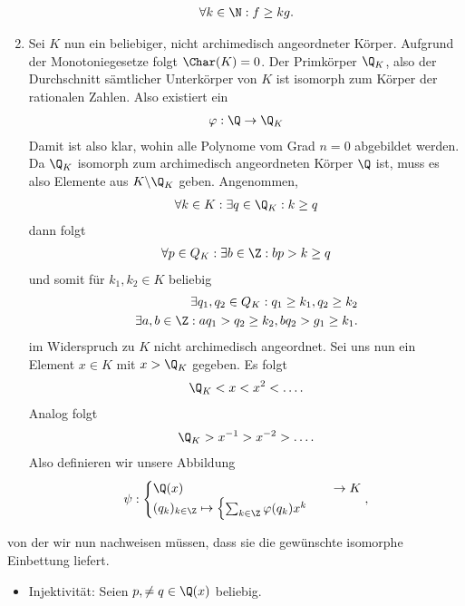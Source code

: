 \begin{solution}
\begin{enumerate}
\begin{align*}
    \forall k \in \N: f \geq kg.
  \end{align*}
  \item Sei $K$ nun ein beliebiger, nicht archimedisch angeordneter Körper.
  Aufgrund der Monotoniegesetze folgt $\Char(K) = 0$.
  Der Primkörper $\Q_K$, also der Durchschnitt sämtlicher Unterkörper von $K$
  ist isomorph zum Körper der rationalen Zahlen. Also existiert ein
  \begin{align*}
    \varphi: \Q \to \Q_K
  \end{align*}
  Damit ist also klar, wohin
  alle Polynome vom Grad $n = 0$ abgebildet werden.
  Da $\Q_K$ isomorph zum archimedisch angeordneten Körper $\Q$ ist,
  muss es also Elemente aus $K \backslash \Q_K$ geben.
  Angenommen,
  \begin{align*}
    \forall k \in K: \exists q \in \Q_K: k \geq q
  \end{align*}
  dann folgt
  \begin{align*}
    \forall p \in Q_K: \exists b \in \Z: bp > k \geq q
  \end{align*}
  und somit für $k_1, k_2 \in K$ beliebig
  \begin{align*}
    \exists q_1,q_2 \in Q_K: q_1 \geq k_1, q_2 \geq k_2 \\
    \exists a,b \in \Z: aq_1 > q_2 \geq k_2, bq_2 > g_1 \geq k_1.
  \end{align*}
  im Widerspruch zu $K$ nicht archimedisch angeordnet.
  Sei uns nun ein Element $x \in K$ mit $x > \Q_K$ gegeben. Es folgt
  \begin{align*}
    \Q_K < x < x^2 < \dots.
  \end{align*}
  Analog folgt
  \begin{align*}
    \Q_K > x^{-1} > x^{-2} > \dots.
  \end{align*}
  Also definieren wir unsere Abbildung
  \begin{align*}
    \psi: \begin{cases}
      \Q(x) &\to K \\
      (q_k)_{k \in \Z} \mapsto
      \begin{cases}
        \sum_{k \in \Z}\varphi(q_k)x^k
      \end{cases}
    \end{cases},
  \end{align*}
\end{enumerate}
von der wir nun nachweisen müssen, dass sie die gewünschte isomorphe Einbettung liefert.
\begin{itemize}
  \item Injektivität: Seien $p, \neq q \in \Q(x)$ beliebig. \\

\end{itemize}
\end{solution}
